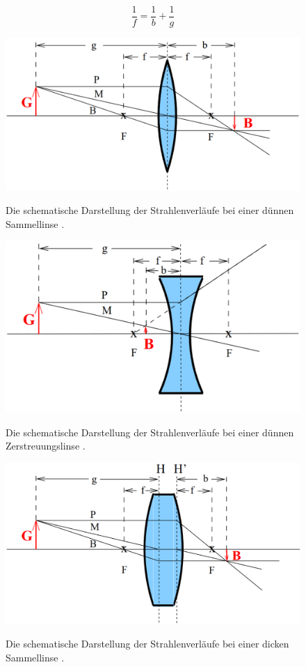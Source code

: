 \begin{equation}
	\frac{1}{f}=\frac{1}{b}+\frac{1}{g}
\end{equation}
\begin{figure}
	\centering
	\caption{Die schematische Darstellung der Strahlenverläufe bei einer dünnen Sammellinse \cite{V408}.}
	\includegraphics[width=\linewidth-150pt,height=\textheight-150pt,keepaspectratio]{content/images/1.png}
	\label{1}
\end{figure}
\begin{figure}
	\centering
	\caption{Die schematische Darstellung der Strahlenverläufe bei einer dünnen Zerstreuungslinse \cite{V408}.}
	\includegraphics[width=\linewidth-150pt,height=\textheight-150pt,keepaspectratio]{content/images/2.png}
	\label{2}
\end{figure}
\begin{figure}
	\centering
	\caption{Die schematische Darstellung der Strahlenverläufe bei einer dicken Sammellinse \cite{V408}.}
	\includegraphics[width=\linewidth-150pt,height=\textheight-150pt,keepaspectratio]{content/images/3.png}
	\label{3}
\end{figure}
